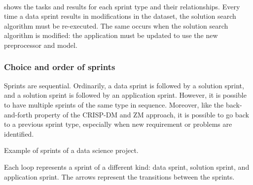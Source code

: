\paragraph{}
 shows the tasks and results for each sprint type and their
relationships.  Every time a data sprint results in modifications in the dataset, the
solution search algorithm must be re-executed.  The same occurs when the solution search
algorithm is modified: the application must be updated to use the new preprocessor
and model.

\subsubsection{Choice and order of sprints}

Sprints are sequential.  Ordinarily, a data sprint is followed by a solution sprint, and a
solution sprint is followed by an application sprint.  However, it is possible to have
multiple sprints of the same type in sequence.  Moreover, like the back-and-forth property of the CRISP-DM
and ZM approach, it is possible to go back to a previous sprint type, especially
when new requirement or problems are identified.

\begin{figurebox}[label=fig:sprints]{Example of sprints of a data science project.}
  \centering
  \tcblower
  Each loop represents a sprint of a different kind: data sprint, solution sprint, and
  application sprint.  The arrows represent the transitions between the sprints.
\end{figurebox}

